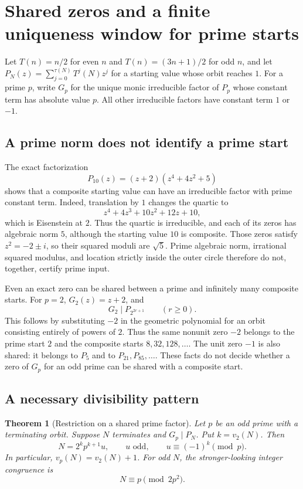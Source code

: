 \documentclass[11pt,a4paper]{article}
\newtheorem{theorem}{Theorem}[section]
\theoremstyle{definition}
\theoremstyle{remark}
\numberwithin{equation}{section}
\begin{document}
\section{Shared zeros and a finite uniqueness window for prime starts}
\label{C:sec:shared-prime-roots}

Let $T(n)=n/2$ for even $n$ and $T(n)=(3n+1)/2$ for odd $n$, and let
$P_N(z)=\sum_{j=0}^{\tau(N)}T^j(N)z^j$ for a starting value whose orbit
reaches $1$. For a prime $p$, write $G_p$ for the unique monic irreducible
factor of $P_p$ whose constant term has absolute value $p$.
All other irreducible factors have constant term $1$ or $-1$.

\subsection{A prime norm does not identify a prime start}

The exact factorization
\[
 P_{10}(z)=(z+2)(z^4+4z^2+5)
\]
shows that a composite starting value can have an irreducible factor with
prime constant term. Indeed, translation by $1$ changes the quartic to
\[
 z^4+4z^3+10z^2+12z+10,
\]
which is Eisenstein at $2$. Thus the quartic is irreducible, and each of its
zeros has algebraic norm $5$, although the starting value $10$ is composite.
Those zeros satisfy $z^2=-2\pm i$, so their squared moduli are $\sqrt5$.
Prime algebraic norm, irrational squared modulus, and location strictly
inside the outer circle therefore do not, together, certify prime input.

Even an exact zero can be shared between a prime and infinitely many
composite starts. For $p=2$, $G_2(z)=z+2$, and
\[
 G_2\mid P_{2^{2r+1}}\qquad(r\geq0).
\]
This follows by substituting $-2$ in the geometric polynomial for an orbit
consisting entirely of powers of $2$. Thus the same nonunit zero $-2$
belongs to the prime start $2$ and the composite starts $8,32,128,\ldots$.
The unit zero $-1$ is also shared: it belongs to $P_5$ and to
$P_{21},P_{85},\ldots$. These facts do not decide whether a zero of $G_p$
for an odd prime can be shared with a composite start.

\subsection{A necessary divisibility pattern}

\begin{theorem}[Restriction on a shared prime factor]
\label{C:thm:shared-prime-valuations}
Let $p$ be an odd prime with a terminating orbit. Suppose $N$ terminates
and $G_p\mid P_N$. Put $k=v_2(N)$. Then
\begin{equation}
\label{C:eq:shared-prime-shape}
 N=2^k p^{k+1}u,\qquad
 u\text{ odd},\qquad u\equiv(-1)^k\pmod p.
\end{equation}
In particular, $v_p(N)=v_2(N)+1$. For odd $N$, the stronger-looking
integer congruence is
\[
 N\equiv p\pmod{2p^2}.
\]
\end{theorem}
\end{document}
